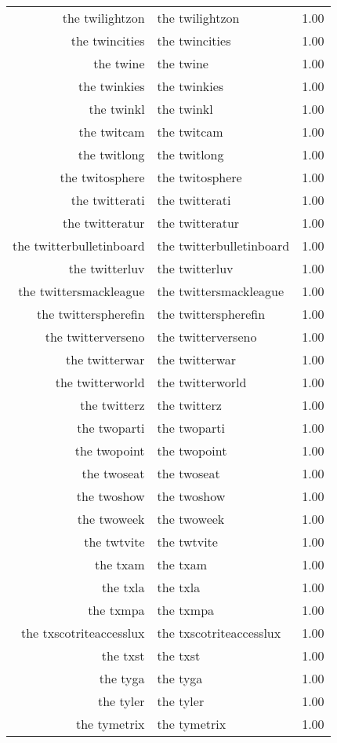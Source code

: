 \begin{table}[ht]
\begin{tabular}{rlr}
  the twilightzon & the twilightzon & 1.00 \\ 
  the twincities & the twincities & 1.00 \\ 
  the twine & the twine & 1.00 \\ 
  the twinkies & the twinkies & 1.00 \\ 
  the twinkl & the twinkl & 1.00 \\ 
  the twitcam & the twitcam & 1.00 \\ 
  the twitlong & the twitlong & 1.00 \\ 
  the twitosphere & the twitosphere & 1.00 \\ 
  the twitterati & the twitterati & 1.00 \\ 
  the twitteratur & the twitteratur & 1.00 \\ 
  the twitterbulletinboard & the twitterbulletinboard & 1.00 \\ 
  the twitterluv & the twitterluv & 1.00 \\ 
  the twittersmackleague & the twittersmackleague & 1.00 \\ 
  the twitterspherefin & the twitterspherefin & 1.00 \\ 
  the twitterverseno & the twitterverseno & 1.00 \\ 
  the twitterwar & the twitterwar & 1.00 \\ 
  the twitterworld & the twitterworld & 1.00 \\ 
  the twitterz & the twitterz & 1.00 \\ 
  the twoparti & the twoparti & 1.00 \\ 
  the twopoint & the twopoint & 1.00 \\ 
  the twoseat & the twoseat & 1.00 \\ 
  the twoshow & the twoshow & 1.00 \\ 
  the twoweek & the twoweek & 1.00 \\ 
  the twtvite & the twtvite & 1.00 \\ 
  the txam & the txam & 1.00 \\ 
  the txla & the txla & 1.00 \\ 
  the txmpa & the txmpa & 1.00 \\ 
  the txscotriteaccesslux & the txscotriteaccesslux & 1.00 \\ 
  the txst & the txst & 1.00 \\ 
  the tyga & the tyga & 1.00 \\ 
  the tyler & the tyler & 1.00 \\ 
  the tymetrix & the tymetrix & 1.00 \\ 

\end{tabular}
\end{table}
